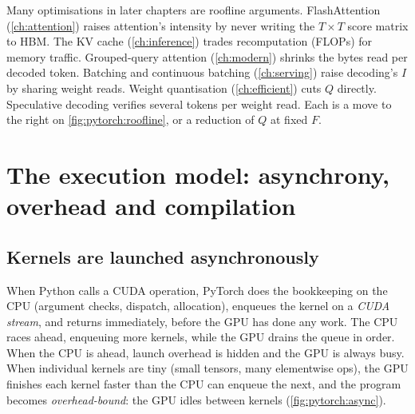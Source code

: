\begin{systemslens}
Many optimisations in later chapters are roofline arguments. FlashAttention (\cref{ch:attention}) raises
attention's intensity by never writing the $T\times T$ score matrix to HBM. The KV cache (\cref{ch:inference})
trades recomputation (FLOPs) for memory traffic. Grouped-query attention (\cref{ch:modern}) shrinks the
bytes read per decoded token. Batching and continuous batching (\cref{ch:serving}) raise decoding's $I$ by
sharing weight reads. Weight quantisation (\cref{ch:efficient}) cuts $Q$ directly. Speculative decoding
verifies several tokens per weight read. Each is a move to the right on \cref{fig:pytorch:roofline}, or a
reduction of $Q$ at fixed $F$.
\end{systemslens}

\section{The execution model: asynchrony, overhead and compilation}\label{sec:pytorch:async}

\subsection{Kernels are launched asynchronously}
When Python calls a CUDA operation, PyTorch does the bookkeeping on the CPU (argument checks, dispatch,
allocation), enqueues the kernel on a \emph{CUDA stream}, and returns immediately, before the GPU has done any
work. The CPU races ahead, enqueuing more kernels, while the GPU drains the queue in order. When the CPU is
ahead, launch overhead is hidden and the GPU is always busy. When individual kernels are tiny (small
tensors, many elementwise ops), the GPU finishes each kernel faster than the CPU can enqueue the next, and the
program becomes \emph{overhead-bound}: the GPU idles between kernels (\cref{fig:pytorch:async}).

